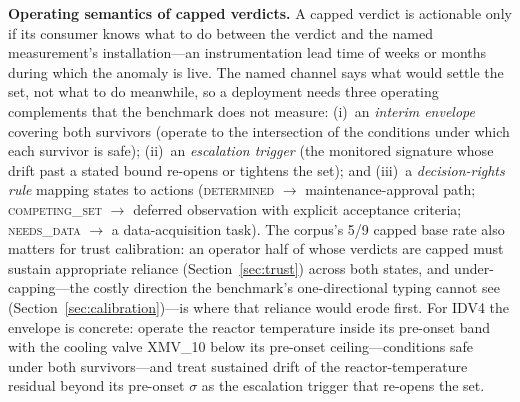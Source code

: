 \documentclass[preprint,12pt]{elsarticle}
\begin{document}
\textbf{Operating semantics of capped verdicts.} A capped verdict is actionable only if its consumer knows what to do between the verdict and the named measurement's installation---an instrumentation lead time of weeks or months during which the anomaly is live. The named channel says what would settle the set, not what to do meanwhile, so a deployment needs three operating complements that the benchmark does not measure: (i)~an \emph{interim envelope} covering both survivors (operate to the intersection of the conditions under which each survivor is safe); (ii)~an \emph{escalation trigger} (the monitored signature whose drift past a stated bound re-opens or tightens the set); and (iii)~a \emph{decision-rights rule} mapping states to actions (\mbox{\textsc{determined}} $\to$ maintenance-approval path; \mbox{\textsc{competing\_set}} $\to$ deferred observation with explicit acceptance criteria; \textsc{needs\_data} $\to$ a data-acquisition task). The corpus's 5/9 capped base rate also matters for trust calibration: an operator half of whose verdicts are capped must sustain appropriate reliance (Section~\ref{sec:trust}) across both states, and under-capping---the costly direction the benchmark's one-directional typing cannot see (Section~\ref{sec:calibration})---is where that reliance would erode first. For IDV4 the envelope is concrete: operate the reactor temperature inside its pre-onset band with the cooling valve XMV\_10 below its pre-onset ceiling---conditions safe under both survivors---and treat sustained drift of the reactor-temperature residual beyond its pre-onset $\sigma$ as the escalation trigger that re-opens the set.
\end{document}
